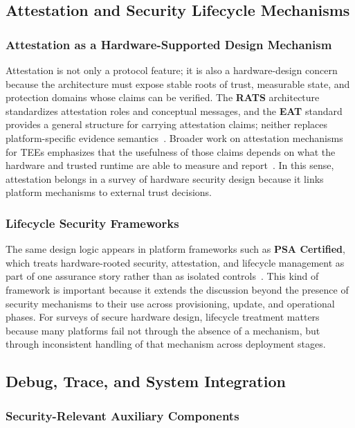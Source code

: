 \subsection{Attestation and Security Lifecycle Mechanisms}

\subsubsection{Attestation as a Hardware-Supported Design Mechanism}

Attestation is not only a protocol feature; it is also a hardware-design concern because the architecture must expose stable roots of trust, measurable state, and protection domains whose claims can be verified. The \textbf{RATS} architecture standardizes attestation roles and conceptual messages, and the \textbf{EAT} standard provides a general structure for carrying attestation claims; neither replaces platform-specific evidence semantics~\cite{rats_rfc,eat_rfc}. Broader work on attestation mechanisms for TEEs emphasizes that the usefulness of those claims depends on what the hardware and trusted runtime are able to measure and report~\cite{menetrey2022attestation}. In this sense, attestation belongs in a survey of hardware security design because it links platform mechanisms to external trust decisions.

\subsubsection{Lifecycle Security Frameworks}

The same design logic appears in platform frameworks such as \textbf{PSA Certified}, which treats hardware-rooted security, attestation, and lifecycle management as part of one assurance story rather than as isolated controls~\cite{psa_certified}. This kind of framework is important because it extends the discussion beyond the presence of security mechanisms to their use across provisioning, update, and operational phases. For surveys of secure hardware design, lifecycle treatment matters because many platforms fail not through the absence of a mechanism, but through inconsistent handling of that mechanism across deployment stages.

\subsection{Debug, Trace, and System Integration}

\subsubsection{Security-Relevant Auxiliary Components}

